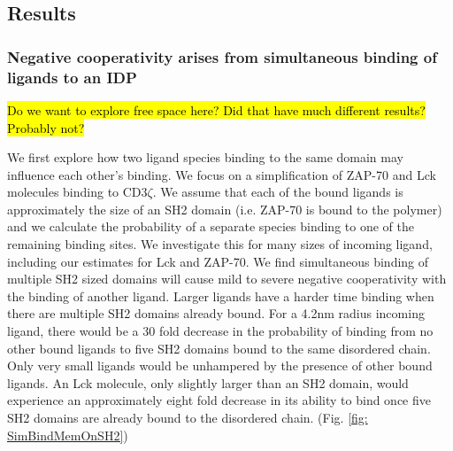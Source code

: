 \documentclass[../../AdvancementSummary.tex]{subfiles}
\begin{document}

\subsection{Results}

\subsubsection{Negative cooperativity arises from simultaneous binding of ligands to an IDP}

\hl{Do we want to explore free space here? Did that have much different results? Probably not?}

We first explore how two ligand species binding to the same domain may influence each other's binding. We focus on a simplification of ZAP-70 and Lck molecules binding to CD3$\zeta$. We assume that each of the bound ligands is approximately the size of an SH2 domain (i.e. ZAP-70 is bound to the polymer) and we calculate the probability of a separate species binding to one of the remaining binding sites.  We investigate this for many sizes of incoming ligand, including our estimates for Lck and ZAP-70. We find simultaneous binding of multiple SH2 sized domains will cause mild to severe negative cooperativity with the binding of another ligand. Larger ligands have a harder time binding when there are multiple SH2 domains already bound. For a 4.2nm radius incoming ligand, there would be a 30 fold decrease in the probability of binding from no other bound ligands to five SH2 domains bound to the same disordered chain. Only very small ligands would be unhampered by the presence of other bound ligands. An Lck molecule, only slightly larger than an SH2 domain, would experience an approximately eight fold decrease in its ability to bind once five SH2 domains are already bound to the disordered chain. (Fig. \ref{fig: SimBindMemOnSH2})
\end{document}
